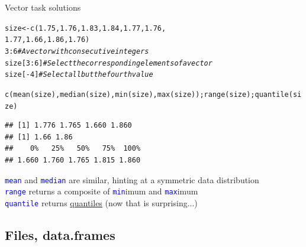 \documentclass[xcolor=table,       handout,    xcolor=dvipsnames]{beamer}\usepackage[]{graphicx}\usepackage[]{color}
\makeatletter
\newcommand{\hlnum}[1]{\textcolor[rgb]{0,0,0}{#1}}
\newcommand{\hlcom}[1]{\textcolor[rgb]{0,0.392,0}{\textit{#1}}}
\newcommand{\hlopt}[1]{\textcolor[rgb]{0,0,0}{#1}}
\newcommand{\hlstd}[1]{\textcolor[rgb]{0,0,0}{#1}}
\newcommand{\hlkwb}[1]{\textcolor[rgb]{0,0,0}{#1}}
\newcommand{\hlkwd}[1]{\textcolor[rgb]{0,0,1}{#1}}
\newenvironment{kframe}{%
 \def\at@end@of@kframe{}%
 \ifinner\ifhmode%
  \def\at@end@of@kframe{\end{minipage}}%
  \begin{minipage}{\columnwidth}%
 \fi\fi%
 \def\FrameCommand##1{\hskip\@totalleftmargin \hskip-\fboxsep
 \colorbox{shadecolor}{##1}\hskip-\fboxsep
     \hskip-\linewidth \hskip-\@totalleftmargin \hskip\columnwidth}%
 \MakeFramed {\advance\hsize-\width
   \@totalleftmargin\z@ \linewidth\hsize
   \@setminipage}}%
 {\par\unskip\endMakeFramed%
 \at@end@of@kframe}
\newenvironment{knitrout}{}{} %
\newcommand{\rcode}[1]{\texttt{\textcolor{Blue}{#1}}} %
\makeatother
\begin{document}
\begin{frame}[fragile]{Vector task solutions}
\begin{knitrout}
\color{fgcolor}\begin{kframe}
\begin{alltt}
\hlstd{size} \hlkwb{<-} \hlkwd{c}\hlstd{(}\hlnum{1.75}\hlstd{,} \hlnum{1.76}\hlstd{,} \hlnum{1.83}\hlstd{,} \hlnum{1.84}\hlstd{,} \hlnum{1.77}\hlstd{,} \hlnum{1.76}\hlstd{,}
          \hlnum{1.77}\hlstd{,} \hlnum{1.66}\hlstd{,} \hlnum{1.86}\hlstd{,} \hlnum{1.76}\hlstd{)}
\hlnum{3}\hlopt{:}\hlnum{6} \hlcom{# A vector with consecutive integers}
\hlstd{size[}\hlnum{3}\hlopt{:}\hlnum{6}\hlstd{]} \hlcom{# Select the corresponding elements of a vector}
\hlstd{size[}\hlopt{-}\hlnum{4}\hlstd{]} \hlcom{# Select all but the fourth value}
\end{alltt}
\end{kframe}
\end{knitrout}
\begin{knitrout}\scriptsize
{}\color{fgcolor}\begin{kframe}
\begin{alltt}
\hlkwd{c}\hlstd{(}\hlkwd{mean}\hlstd{(size),} \hlkwd{median}\hlstd{(size),} \hlkwd{min}\hlstd{(size),} \hlkwd{max}\hlstd{(size));} \hlkwd{range}\hlstd{(size);} \hlkwd{quantile}\hlstd{(size)}
\end{alltt}
\begin{verbatim}
## [1] 1.776 1.765 1.660 1.860
## [1] 1.66 1.86
##    0%   25%   50%   75%  100% 
## 1.660 1.760 1.765 1.815 1.860
\end{verbatim}
\end{kframe}
\end{knitrout}

\rcode{mean} and \rcode{median} are similar, hinting at a symmetric data distribution\\
\rcode{range} returns a composite of \rcode{min}imum and \rcode{max}imum\\
\rcode{quantile} returns \href{http://lmgtfy.com/?q=quantile}{quantiles} (now that is surprising...)
\end{frame}

\subsection{Files, data.frames}
\end{document}
